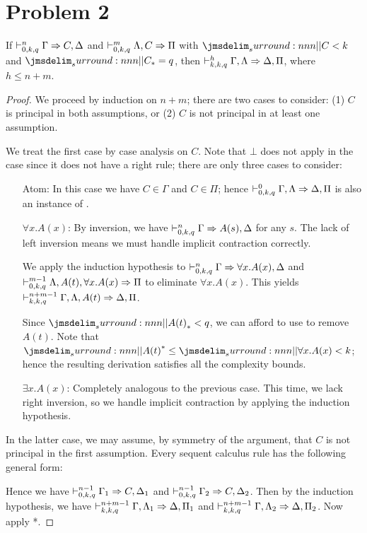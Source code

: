 \documentclass[a4paper]{article}
\begin{document}
\section*{Problem 2}\label{0009}

\begin{lemma}\label{0004}
  If $\dVdash{n}{0}{k}{q} \Gamma \Rightarrow C,\Delta$ and $\dVdash{m}{0}{k}{q} \Lambda,C \Rightarrow \Pi$ with $\cRank{C} < k$ and $\qRank{C} = q$, then $\dVdash{h}{k}{k}{q} \Gamma,\Lambda \Rightarrow \Delta,\Pi$, where $h \leq n + m$.
\end{lemma}
\begin{proof}
  We proceed by induction on $n + m$; there are two cases to consider: (1) $C$ is principal in both assumptions, or (2) $C$ is not principal in at least one assumption.

  We treat the first case by case analysis on $C$.
  Note that $\bot$ does not apply in the case since it does not have a right rule; there are only three cases to consider:
  \begin{itemize}
  \item[Atom:] In this case we have $C \in \Gamma$ and $C \in \Pi$; hence $\dVdash{0}{0}{k}{q} \Gamma,\Lambda \Rightarrow \Delta,\Pi$ is also an instance of \rId.
  \item[$\forall x.A(x)$:] By inversion, we have $\dVdash{n}{0}{k}{q} \Gamma \Rightarrow A(s),\Delta$ for any $s$.
    The lack of left inversion means we must handle implicit contraction correctly.

    We apply the induction hypothesis to $\dVdash{n}{0}{k}{q} \Gamma \Rightarrow \forall x.A(x), \Delta$ and $\dVdash{m-1}{0}{k}{q} \Lambda,A(t),\forall x.A(x) \Rightarrow \Pi$ to eliminate $\forall x.A(x)$.
    This yields $\dVdash{n+m-1}{k}{k}{q} \Gamma,\Lambda,A(t) \Rightarrow \Delta,\Pi$.

    Since $\qRank{A(t)} < q$, we can afford to use \rCut{} to remove $A(t)$.
    Note that $\dRank{A(t)} \leq \cRank{\forall x.A(x)} < k$; hence the resulting derivation satisfies all the complexity bounds.
  \item[$\exists x.A(x)$:] Completely analogous to the previous case.
    This time, we lack right inversion, so we handle implicit contraction by applying the induction hypothesis.
  \end{itemize}
  In the latter case, we may assume, by symmetry of the argument, that $C$ is not principal in the first assumption.
  Every sequent calculus rule has the following general form:
  \begin{mathpar}
  \end{mathpar}
  Hence we have $\dVdash{n-1}{0}{k}{q} \Gamma_1 \Rightarrow C,\Delta_1$ and $\dVdash{n-1}{0}{k}{q} \Gamma_2 \Rightarrow C,\Delta_2$.
  Then by the induction hypothesis, we have $\dVdash{n+m-1}{k}{k}{q} \Gamma,\Lambda_1 \Rightarrow \Delta,\Pi_1$ and $\dVdash{n+m-1}{k}{k}{q} \Gamma,\Lambda_2 \Rightarrow \Delta,\Pi_2$.
  Now apply *.
\end{proof}
\end{document}

